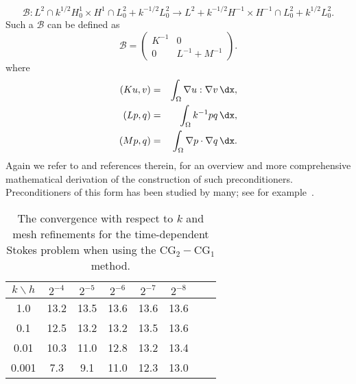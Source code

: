 \[
\mathcal{B}: L^2 \cap k^{1/2} H^1_0 \times H^1 \cap L_0^2 + k^{-1/2} L_0^2 \rightarrow
L^2 + k^{-1/2} H^{-1} \times H^{-1} \cap L_0^2 + k^{1/2} L_0^2  .
\]
Such a $\mathcal{B}$ can be defined as
\[
\mathcal{B}
=
\begin{pmatrix} K^{-1} & 0 \\ 0 & L^{-1} + M^{-1} \end{pmatrix}.
\]
where
\begin{eqnarray}
(K u, v) &=& \int_\Omega \nabla u: \nabla v \, \dx, \\
(L p, q) &=& \int_\Omega k^{-1} p q \, \dx, \\
(M p, q) &=& \int_\Omega \nabla p \cdot  \nabla q \, \dx.
\end{eqnarray}
Again we refer to \citet{MardalWinther11} and references therein, for
an overview and more comprehensive mathematical derivation of the
construction of such preconditioners.  Preconditioners of this form
has been studied by many; see for
example~\citet{CahouetChabard1988,ElmanSilvesterWathen2005,MardalWinther2004,MardalWinther11,Turek1999}.

\begin{table}
\begin{center}
\begin{tabular}{|c|c||c|c|c|c|c|c|}
\hline
$k\backslash h$ & $2^{-4}$ & $2^{-5}$ & $2^{-6}$ & $2^{-7}$ & $2^{-8}$ \\ \hline\hline
1.0 & 13.2 & 13.5 & 13.6 & 13.6 & 13.6 \\ \hline
0.1 & 12.5 & 13.2 & 13.2 & 13.5 & 13.6 \\ \hline
0.01 & 10.3 & 11.0 & 12.8 & 13.2 & 13.4 \\ \hline
0.001 & 7.3 & 9.1 & 11.0 & 12.3  & 13.0 \\ \hline
\end{tabular}
\caption{The convergence with respect to $k$ and mesh refinements for the time-dependent Stokes problem
when using the $\mathrm{CG}_2-\mathrm{CG}_1$ method.}\label{timestokes:ex}
\end{center}
\end{table}

